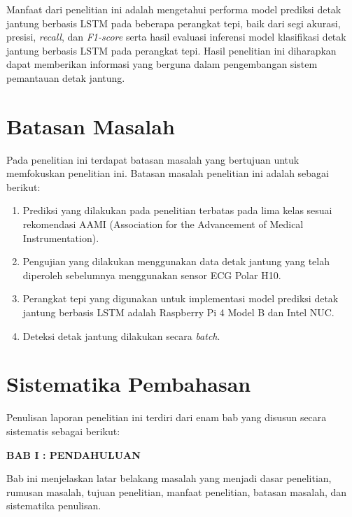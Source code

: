 Manfaat dari penelitian ini adalah mengetahui performa model prediksi detak jantung berbasis LSTM pada beberapa perangkat tepi, baik dari segi akurasi, presisi, \emph{recall}, dan \emph{F1-score} serta hasil evaluasi inferensi model klasifikasi detak jantung berbasis LSTM pada perangkat tepi.
Hasil penelitian ini diharapkan dapat memberikan informasi yang berguna dalam pengembangan sistem pemantauan detak jantung.


\section{Batasan Masalah}

Pada penelitian ini terdapat batasan masalah yang bertujuan untuk memfokuskan penelitian ini. Batasan masalah penelitian ini adalah sebagai berikut:
\begin{enumerate}
  \item Prediksi yang dilakukan pada penelitian terbatas pada lima kelas sesuai rekomendasi AAMI (Association for the Advancement of Medical Instrumentation).
  \item Pengujian yang dilakukan menggunakan data detak jantung yang telah diperoleh sebelumnya menggunakan sensor ECG Polar H10.
  \item Perangkat tepi yang digunakan untuk implementasi model prediksi detak jantung berbasis LSTM adalah Raspberry Pi 4 Model B dan Intel NUC.
  \item Deteksi detak jantung dilakukan secara \textit{batch}.
\end{enumerate}




\section{Sistematika Pembahasan}

Penulisan laporan penelitian ini terdiri dari enam bab yang disusun secara sistematis sebagai berikut:

\noindent
\textbf{BAB I : PENDAHULUAN}

Bab ini menjelaskan latar belakang masalah yang menjadi dasar penelitian, rumusan masalah, tujuan penelitian, manfaat penelitian, batasan masalah, dan sistematika penulisan.\\

